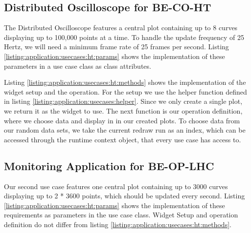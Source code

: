 

\subsection{Distributed Oscilloscope for BE-CO-HT}

The Distributed Oscilloscope features a central plot containing up to 8 curves
displaying up to 100,000 points at a time. To handle the update frequency of 25
Hertz, we will need a minimum frame rate of 25 frames per second. Listing
\ref{listing:application:usecases:ht:params} shows the implementation of these
parameters in a use case class as class attributes.



Listing \ref{listing:application:usecases:ht:methods} shows the implementation
of the widget setup and the operation. For the setup we use the helper function
defined in listing \ref{listing:application:usecases:helper}. Since we only
create a single plot, we return it as the widget to use. The next function is
our operation definition, where we choose data and display in in our created
plots. To choose data from our random data sets, we take the current redraw run
as an index, which can be accessed through the runtime context object, that
every use case has access to.



\subsection{Monitoring Application for BE-OP-LHC}

Our second use case features one central plot containing up to 3000 curves
displaying up to 2 * 3600 points, which should be updated every second. Listing
\ref{listing:application:usecases:ht:params} shows the implementation of these
requirements as parameters in the use case class. Widget Setup and operation
definition do not differ from listing
\ref{listing:application:usecases:ht:methods}.


